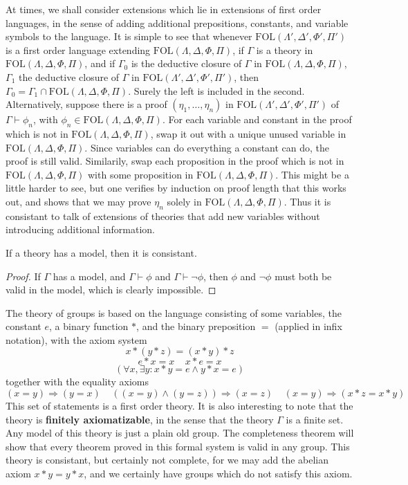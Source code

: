At times, we shall consider extensions which lie in extensions of first order languages, in the sense of adding additional prepositions, constants, and variable symbols to the language. It is simple to see that whenever $\text{FOL}(\Lambda',\Delta',\Phi',\Pi')$ is a first order language extending $\text{FOL}(\Lambda,\Delta,\Phi,\Pi)$, if $\Gamma$ is a theory in $\text{FOL}(\Lambda,\Delta,\Phi,\Pi)$, and if $\Gamma_0$ is the deductive closure of $\Gamma$ in $\text{FOL}(\Lambda,\Delta,\Phi,\Pi)$, $\Gamma_1$ the deductive closure of $\Gamma$ in $\text{FOL}(\Lambda',\Delta',\Phi',\Pi')$, then $\Gamma_0 = \Gamma_1 \cap \text{FOL}(\Lambda,\Delta,\Phi,\Pi)$. Surely the left is included in the second. Alternatively, suppose there is a proof $(\eta_1, \dots, \eta_n)$ in $\text{FOL}(\Lambda',\Delta',\Phi',\Pi')$ of $\Gamma \vdash \phi_n$, with $\phi_n \in \text{FOL}(\Lambda,\Delta,\Phi,\Pi)$. For each variable and constant in the proof which is not in $\text{FOL}(\Lambda,\Delta,\Phi,\Pi)$, swap it out with a unique unused variable in $\text{FOL}(\Lambda,\Delta,\Phi,\Pi)$. Since variables can do everything a constant can do, the proof is still valid. Similarily, swap each proposition in the proof which is not in $\text{FOL}(\Lambda,\Delta,\Phi,\Pi)$ with some proposition in $\text{FOL}(\Lambda,\Delta,\Phi,\Pi)$. This might be a little harder to see, but one verifies by induction on proof length that this works out, and shows that we may prove $\eta_n$ solely in $\text{FOL}(\Lambda,\Delta,\Phi,\Pi)$. Thus it is consistant to talk of extensions of theories that add new variables without introducing additional information.

\begin{lemma}
    If a theory has a model, then it is consistant.
\end{lemma}
\begin{proof}
    If $\Gamma$ has a model, and $\Gamma \vdash \phi$ and $\Gamma \vdash \neg \phi$, then $\phi$ and $\neg \phi$ must both be valid in the model, which is clearly impossible.
\end{proof}

\begin{example}
    The theory of groups is based on the language consisting of some variables, the constant $e$, a binary function $*$, and the binary preposition $=$ (applied in infix notation), with the axiom system
    \[ x * (y * z) = (x * y) * z \]
    \[ e * x = x\ \ \ \ \ x * e = x \]
    \[ (\forall x, \exists y: x * y = e \wedge y * x = e) \]
    together with the equality axioms
    \[ (x = y) \Rightarrow (y = x)\ \ \ \ \ ((x = y) \wedge (y = z)) \Rightarrow (x = z)\ \ \ \ \ (x = y) \Rightarrow (x * z = x * y) \]
    This set of statements is a first order theory. It is also interesting to note that the theory is {\bf finitely axiomatizable}, in the sense that the theory $\Gamma$ is a finite set. Any model of this theory is just a plain old group. The completeness theorem will show that every theorem proved in this formal system is valid in any group. This theory is consistant, but certainly not complete, for we may add the abelian axiom $x * y = y * x$, and we certainly have groups which do not satisfy this axiom.
\end{example}


